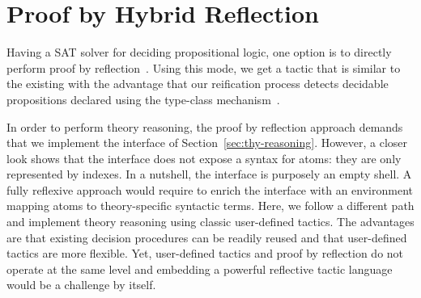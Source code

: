 \documentclass[utf8,a4paper,UKenglish,cleveref, autoref, thm-restate]{lipics-v2021}
\begin{document}
\section{Proof by Hybrid Reflection}
\label{sec:reflection}
Having a SAT solver for deciding propositional logic, one option is to
directly perform proof by
reflection~\cite[Chap. 16]{casteran:hal-00344237}. Using this mode, we
get a tactic that is similar to the existing  with the
advantage that our reification process detects decidable propositions
declared using the type-class mechanism~\cite{SozeauO08}.
%

In order to perform theory reasoning, the proof by reflection approach
demands that we implement the interface of
Section~\ref{sec:thy-reasoning}. However, a closer look shows that the
interface does not expose a syntax for atoms: they are only
represented by indexes. In a nutshell, the interface is purposely  an
empty shell. A fully reflexive approach would require to enrich the
interface with an environment mapping atoms to theory-specific
syntactic terms.
%
Here, we follow a different path and implement theory reasoning using
classic user-defined tactics.
%
The advantages are that existing decision procedures can be readily
reused and that user-defined tactics are more flexible.
%
Yet, user-defined tactics and proof by reflection  do not
operate at the same level and embedding a powerful reflective tactic language
would be a challenge by itself.
\end{document}
